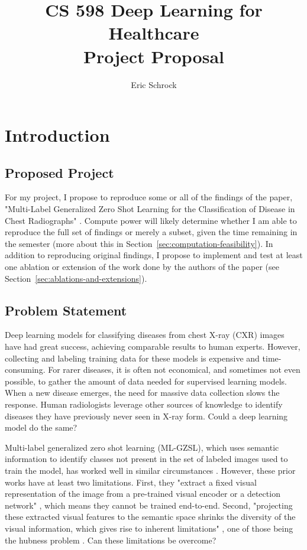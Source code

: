 \documentclass[letterpaper]{article} %
\title{CS 598 Deep Learning for Healthcare\\Project Proposal}
\author {Eric Schrock}
\begin{document}
\maketitle

\section{Introduction}

\subsection{Proposed Project}

For my project, I propose to reproduce some or all of the findings of the paper, "Multi-Label Generalized Zero Shot Learning for the Classification of Disease in Chest Radiographs" \cite{hayat2021multilabel}. Compute power will likely determine whether I am able to reproduce the full set of findings or merely a subset, given the time remaining in the semester (more about this in Section~\ref{sec:computation-feasibility}). In addition to reproducing original findings, I propose to implement and test at least one ablation or extension of the work done by the authors of the paper (see Section~\ref{sec:ablations-and-extensions}).

\subsection{Problem Statement}

Deep learning models for classifying diseases from chest X-ray (CXR) images have had great success, achieving comparable results to human experts. However, collecting and labeling training data for these models is expensive and time-consuming. For rarer diseases, it is often not economical, and sometimes not even possible, to gather the amount of data needed for supervised learning models. When a new disease emerges, the need for massive data collection slows the response. Human radiologists leverage other sources of knowledge to identify diseases they have previously never seen in X-ray form. Could a deep learning model do the same?

Multi-label generalized zero shot learning (ML-GZSL), which uses semantic information to identify classes not present in the set of labeled images used to train the model, has worked well in similar circumstances \cite{10.1109/TPAMI.2012.256, 10.1109/TMM.2019.2924511, 9157745}. However, these prior works have at least two limitations. First, they "extract a fixed visual representation of the image from a pre-trained visual encoder or a detection network" \cite{hayat2021multilabel}, which means they cannot be trained end-to-end. Second, "projecting these extracted visual features to the semantic space shrinks the diversity of the visual information, which gives rise to inherent limitations" \cite{hayat2021multilabel}, one of those being the hubness problem \cite{dinu2015improvingzeroshotlearningmitigating}. Can these limitations be overcome?
\end{document}
